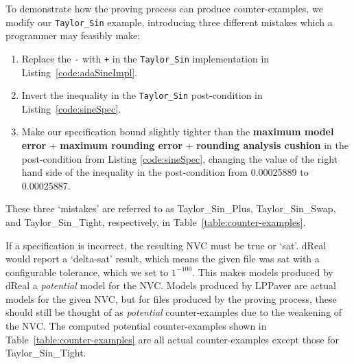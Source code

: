 \documentclass[runningheads]{llncs}
\begin{document}
To demonstrate how the proving process can produce counter-examples, we modify our \lstinline{Taylor_Sin} example, introducing three different mistakes which a programmer may feasibly make:
\begin{enumerate}
  \item Replace the \lstinline{-} with \lstinline{+} in the \lstinline{Taylor_Sin} implementation in Listing~\ref{code:adaSineImpl}.
  \item Invert the inequality in the \lstinline{Taylor_Sin} post-condition in Listing~\ref{code:sineSpec}.
  \item Make our specification bound slightly tighter than the \textbf{maximum model error} + \textbf{maximum rounding error} + \textbf{rounding analysis cushion} in the post-condition from Listing \ref{code:sineSpec}, changing the value of the right hand side of the inequality in the post-condition from 0.00025889 to 0.00025887.
\end{enumerate}
These three `mistakes' are referred to as Taylor\_Sin\_Plus, Taylor\_Sin\_Swap, and Taylor\_Sin\_Tight, respectively, in Table~\ref{table:counter-examples}.

If a specification is incorrect, the resulting NVC must be true or `sat'.
dReal would report a `delta-sat' result, which means the given file was sat with a configurable tolerance, which we set to $1^{-100}$.
This makes models produced by dReal a \emph{potential} model for the NVC.
Models produced by LPPaver are actual models for the given NVC, but for files produced by the proving process, these should still be thought of as \emph{potential} counter-examples due to the weakening of the NVC.
The computed potential counter-examples shown in Table~\ref{table:counter-examples} are all actual counter-examples except those for Taylor\_Sin\_Tight.
\end{document}
